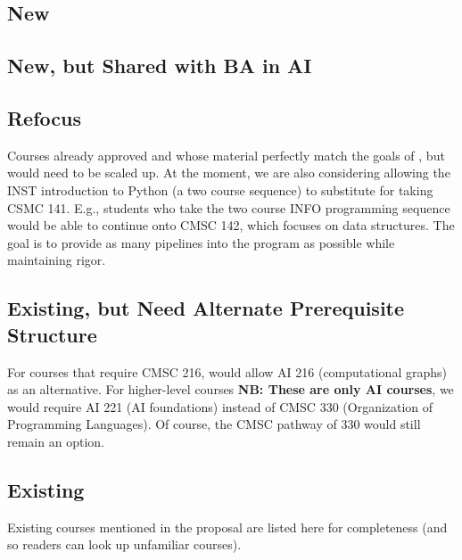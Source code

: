 \documentclass[
10pt, %
a4paper, %
oneside, %
headinclude,footinclude, %
BCOR5mm, %
]{scrartcl}
\begin{document}
  \subsection{New}

  

  \subsection{New, but Shared with BA in AI}

  

  \subsection{Refocus}

    Courses already approved and whose material perfectly match the goals of \short{}, but would need to be scaled up.  At the moment, we are also considering allowing the INST introduction to Python (a two course sequence) to substitute for taking CSMC 141.  E.g., students who take the two course INFO programming sequence would be able to continue onto CMSC 142, which focuses on data structures.  The goal is to provide as many pipelines into the program as possible while maintaining rigor.
    
  


    \subsection{Existing, but Need Alternate Prerequisite Structure}

    For courses that require CMSC 216, would allow AI 216 (computational graphs) as an alternative.  For higher-level courses \textbf{NB: These are only AI courses}, we would require AI 221 (AI foundations) instead of CMSC 330 (Organization of Programming Languages).  Of course, the CMSC pathway of 330 would still remain an option.

    

  \subsection{Existing}

    Existing courses mentioned in the proposal are listed here for completeness (and so readers can look up unfamiliar courses).  

  
  
\end{document}
